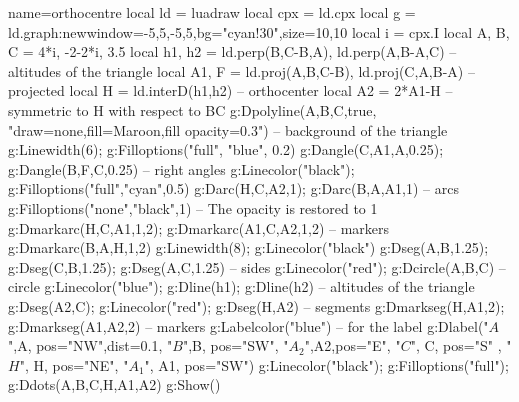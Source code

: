 \begin{luadraw}{name=orthocentre}
local ld = luadraw
local cpx = ld.cpx
local g = ld.graph:new{window={-5,5,-5,5},bg="cyan!30",size={10,10}}
local i = cpx.I
local A, B, C = 4*i, -2-2*i, 3.5
local h1, h2 = ld.perp({B,C-B},A), ld.perp({A,B-A},C) -- altitudes of the triangle
local A1, F = ld.proj(A,{B,C-B}), ld.proj(C,{A,B-A}) -- projected
local H = ld.interD(h1,h2) -- orthocenter
local A2 = 2*A1-H -- symmetric to H with respect to BC
g:Dpolyline({A,B,C},true, "draw=none,fill=Maroon,fill opacity=0.3") -- background of the triangle
g:Linewidth(6); g:Filloptions("full", "blue", 0.2)
g:Dangle(C,A1,A,0.25); g:Dangle(B,F,C,0.25) -- right angles
g:Linecolor("black"); g:Filloptions("full","cyan",0.5)
g:Darc(H,C,A2,1); g:Darc(B,A,A1,1) -- arcs
g:Filloptions("none","black",1) -- The opacity is restored to 1
g:Dmarkarc(H,C,A1,1,2); g:Dmarkarc(A1,C,A2,1,2) -- markers
g:Dmarkarc(B,A,H,1,2)
g:Linewidth(8); g:Linecolor("black")
g:Dseg({A,B},1.25); g:Dseg({C,B},1.25); g:Dseg({A,C},1.25) -- sides
g:Linecolor("red"); g:Dcircle(A,B,C) -- circle
g:Linecolor("blue"); g:Dline(h1); g:Dline(h2) -- altitudes of the triangle
g:Dseg({A2,C}); g:Linecolor("red"); g:Dseg({H,A2}) -- segments
g:Dmarkseg(H,A1,2); g:Dmarkseg(A1,A2,2) -- markers
g:Labelcolor("blue") -- for the label
g:Dlabel("$A$",A, {pos="NW",dist=0.1}, "$B$",B, {pos="SW"}, "$A_2$",A2,{pos="E"},
"$C$", C, {pos="S" }, "$H$", H, {pos="NE"}, "$A_1$", A1, {pos="SW"})
g:Linecolor("black"); g:Filloptions("full"); g:Ddots({A,B,C,H,A1,A2})
g:Show()
\end{luadraw}
